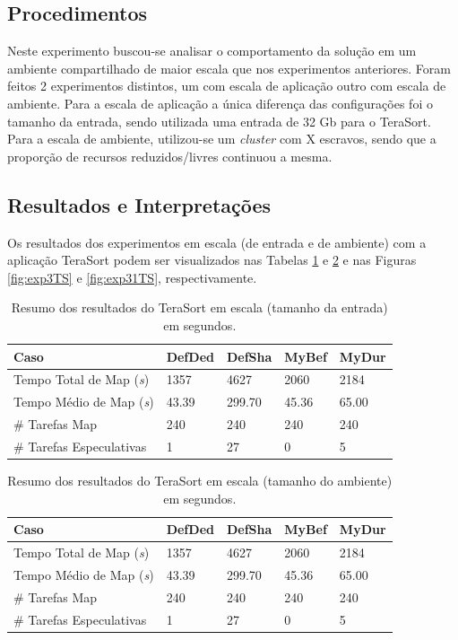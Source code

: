 \subsection{Procedimentos}
Neste experimento buscou-se analisar o comportamento da solução em um ambiente compartilhado de maior escala que nos experimentos anteriores. Foram feitos 2 experimentos distintos, um com escala de aplicação outro com escala de ambiente. Para a escala de aplicação a única diferença das configurações foi o tamanho da entrada, sendo utilizada uma entrada de 32 Gb para o TeraSort. Para a escala de ambiente, utilizou-se um \textit{cluster} com X escravos, sendo que a proporção de recursos reduzidos/livres continuou a mesma. 

\subsection{Resultados e Interpretações}
Os resultados dos experimentos em escala (de entrada e de ambiente) com a aplicação TeraSort podem ser visualizados nas Tabelas \ref{tab:exp3TS} e \ref{tab:exp31TS} e nas Figuras \ref{fig:exp3TS} e \ref{fig:exp31TS}, respectivamente.

\begin{table}[h!]
	\caption{Resumo dos resultados do TeraSort em escala (tamanho da entrada) em segundos.} \label{tab:exp3TS}
	\begin{tabular*}{\hsize}{l|llll} %
		\textbf{Caso} & \textbf{DefDed} & \textbf{DefSha} & \textbf{MyBef} & \textbf{MyDur}\\
		\hline
		Tempo Total de Map ({\it{s}}) & 1357 & 4627 & 2060 & 2184 \\
		Tempo Médio de Map ({\it{s}}) & 43.39 & 299.70 & 45.36 & 65.00 \\
		\# Tarefas Map & 240 & 240 & 240 & 240 \\
		\# Tarefas Especulativas & 1 & 27 & 0 & 5 \\
	\end{tabular*}
\end{table}
%
%


\begin{table}[h!]
	\caption{Resumo dos resultados do TeraSort em escala (tamanho do ambiente) em segundos.} \label{tab:exp31TS}
	\begin{tabular*}{\hsize}{l|llll} %
		\textbf{Caso} & \textbf{DefDed} & \textbf{DefSha} & \textbf{MyBef} & \textbf{MyDur}\\
		\hline
		Tempo Total de Map ({\it{s}}) & 1357 & 4627 & 2060 & 2184 \\
		Tempo Médio de Map ({\it{s}}) & 43.39 & 299.70 & 45.36 & 65.00 \\
		\# Tarefas Map & 240 & 240 & 240 & 240 \\
		\# Tarefas Especulativas & 1 & 27 & 0 & 5 \\
	\end{tabular*}
\end{table}
%
%

